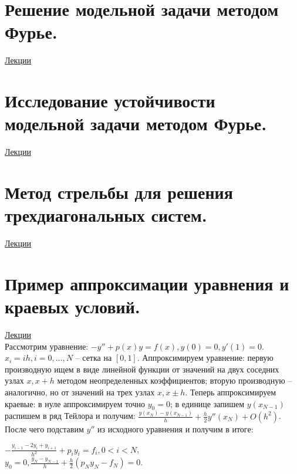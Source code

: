 \documentclass[specialist, subf, href, colorlinks=true, 12pt, times, mtpro, final]{disser}
\theoremstyle{definition}
\begin{document}
{\section {Решение модельной задачи методом Фурье.}
    \hyperlink {lects.109}{Лекции}\\

\section {Исследование устойчивости модельной задачи методом Фурье.}
    \hyperlink {lects.111}{Лекции}\\

\section {Метод стрельбы для решения трехдиагональных систем.}
    \hyperlink {lects.112}{Лекции}\\

\section {Пример аппроксимации уравнения и краевых условий.}
    \hyperlink {lects.115}{Лекции}\\
    Рассмотрим уравнение: $-y'' + p(x)y = f(x), y(0) = 0, y'(1) = 0$.\\
    $x_i = ih, i = 0, \dots, N$ -- сетка на $[0,1]$. Аппроксимируем уравнение: первую производную ищем в виде линейной функции от значений на двух соседних узлах $x, x+h$ методом неопределенных коэффициентов; вторую производную -- аналогично, но от значений на трех узлах $x, x\pm h$. Теперь аппроксимируем краевые: в нуле аппроксимируем точно $y_0 = 0$; в единице запишем $y(x_{N-1})$ распишем в ряд Тейлора и получим:
    $\frac{y(x_N)-y(x_{N-1})}{h} + \frac{h}{2}y''(x_N) + O(h^2)$. После чего подставим $y''$ из исходного уравнения и получим в итоге:
    \begin{center}
    	$-\frac{y_{i-1} - 2y_i + y_{i+1}}{h^2} + p_iy_i = f_i, 0 < i < N$,\\
    	$y_0 = 0, \frac{y_N - y_{N-1}}{h} + \frac{h}{2}(p_Ny_N - f_N) = 0$.
    \end{center}

}
\end{document}
